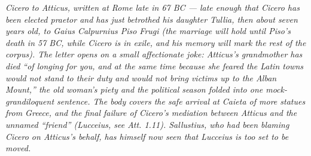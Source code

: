 
\textit{Cicero to Atticus, written at Rome late in 67 BC ---
late enough that Cicero has been elected praetor and has
just betrothed his daughter Tullia, then about seven years
old, to Gaius Calpurnius Piso Frugi (the marriage will hold
until Piso's death in 57 BC, while Cicero is in exile, and
his memory will mark the rest of the corpus). The letter
opens on a small affectionate joke: Atticus's grandmother
has died ``of longing for you, and at the same time because
she feared the Latin towns would not stand to their duty
and would not bring victims up to the Alban Mount,'' the
old woman's piety and the political season folded into one
mock-grandiloquent sentence. The body covers the safe
arrival at Caieta of more statues from Greece, and the
final failure of Cicero's mediation between Atticus and the
unnamed ``friend'' (Lucceius, see \textit{Att.} 1.11).
Sallustius, who had been blaming Cicero on Atticus's
behalf, has himself now seen that Lucceius is too set to
be moved.}
